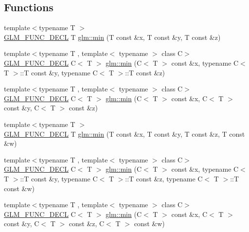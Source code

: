 \subsection*{Functions}
\begin{DoxyCompactItemize}
\item 
{\footnotesize template$<$typename T $>$ }\\\hyperlink{setup_8hpp_ab2d052de21a70539923e9bcbf6e83a51}{G\+L\+M\+\_\+\+F\+U\+N\+C\+\_\+\+D\+E\+CL} T \hyperlink{group__gtx__extented__min__max_ga713d3f9b3e76312c0d314e0c8611a6a6}{glm\+::min} (T const \&x, T const \&y, T const \&z)
\item 
{\footnotesize template$<$typename T , template$<$ typename $>$ class C$>$ }\\\hyperlink{setup_8hpp_ab2d052de21a70539923e9bcbf6e83a51}{G\+L\+M\+\_\+\+F\+U\+N\+C\+\_\+\+D\+E\+CL} C$<$ T $>$ \hyperlink{group__gtx__extented__min__max_ga74d1a96e7cdbac40f6d35142d3bcbbd4}{glm\+::min} (C$<$ T $>$ const \&x, typename C$<$ T $>$\+::T const \&y, typename C$<$ T $>$\+::T const \&z)
\item 
{\footnotesize template$<$typename T , template$<$ typename $>$ class C$>$ }\\\hyperlink{setup_8hpp_ab2d052de21a70539923e9bcbf6e83a51}{G\+L\+M\+\_\+\+F\+U\+N\+C\+\_\+\+D\+E\+CL} C$<$ T $>$ \hyperlink{group__gtx__extented__min__max_ga42b5c3fc027fd3d9a50d2ccc9126d9f0}{glm\+::min} (C$<$ T $>$ const \&x, C$<$ T $>$ const \&y, C$<$ T $>$ const \&z)
\item 
{\footnotesize template$<$typename T $>$ }\\\hyperlink{setup_8hpp_ab2d052de21a70539923e9bcbf6e83a51}{G\+L\+M\+\_\+\+F\+U\+N\+C\+\_\+\+D\+E\+CL} T \hyperlink{group__gtx__extented__min__max_ga95466987024d03039607f09e69813d69}{glm\+::min} (T const \&x, T const \&y, T const \&z, T const \&w)
\item 
{\footnotesize template$<$typename T , template$<$ typename $>$ class C$>$ }\\\hyperlink{setup_8hpp_ab2d052de21a70539923e9bcbf6e83a51}{G\+L\+M\+\_\+\+F\+U\+N\+C\+\_\+\+D\+E\+CL} C$<$ T $>$ \hyperlink{group__gtx__extented__min__max_ga4fe35dd31dd0c45693c9b60b830b8d47}{glm\+::min} (C$<$ T $>$ const \&x, typename C$<$ T $>$\+::T const \&y, typename C$<$ T $>$\+::T const \&z, typename C$<$ T $>$\+::T const \&w)
\item 
{\footnotesize template$<$typename T , template$<$ typename $>$ class C$>$ }\\\hyperlink{setup_8hpp_ab2d052de21a70539923e9bcbf6e83a51}{G\+L\+M\+\_\+\+F\+U\+N\+C\+\_\+\+D\+E\+CL} C$<$ T $>$ \hyperlink{group__gtx__extented__min__max_ga7471ea4159eed8dd9ea4ac5d46c2fead}{glm\+::min} (C$<$ T $>$ const \&x, C$<$ T $>$ const \&y, C$<$ T $>$ const \&z, C$<$ T $>$ const \&w)

\end{DoxyCompactItemize}
